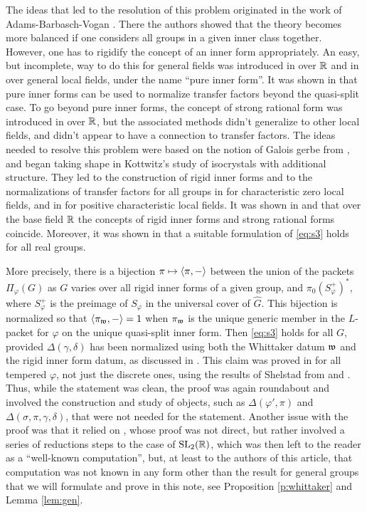 \documentclass{article}
\theoremstyle{definition}
\numberwithin{equation}{section}
\renewcommand{\-}{\hyp{}}
\begin{document}
The ideas that led to the resolution of this problem originated in the work of Adams-Barbasch-Vogan \cite{ABV92}. There the authors showed that the theory becomes more balanced if one considers all groups in a given inner class together. However, one has to rigidify the concept of an inner form appropriately. An easy, but incomplete, way to do this for general fields was introduced in \cite{ABV92} over $\mathbb{R}$ and in \cite{Vog93} over general local fields, under the name ``pure inner form''. It was shown in \cite[\S2.2]{KalECI} that pure inner forms can be used to normalize transfer factors beyond the quasi-split case. To go beyond pure inner forms, the concept of strong rational form was introduced in \cite{ABV92} over $\mathbb{R}$, but the associated methods didn't generalize to other local fields, and didn't appear to have a connection to transfer factors. The ideas needed to resolve this problem were based on the notion of Galois gerbe from \cite{LR87}, and began taking shape in Kottwitz's study \cite{Kot97} of isocrystals with additional structure. They led to the construction of rigid inner forms and to the normalizations of transfer factors for all groups in \cite{KalRI} for characteristic zero local fields, and in \cite{Dillery20} for positive characteristic local fields. It was shown in \cite[\S5.2]{KalRI} and that over the base field $\mathbb{R}$ the concepts of rigid inner forms and strong rational forms coincide. Moreover, it was shown in \cite[\S5.6]{KalRI} that a suitable formulation of \eqref{eq:s3} holds for all real groups. 

More precisely, there is a bijection $\pi \mapsto \langle\pi,-\rangle$ between the union of the packets $\Pi_\varphi(G)$ as $G$ varies over all rigid inner forms of a given group, and $\pi_0(S_\varphi^+)^*$, where $S_\varphi^+$ is the preimage of $S_\varphi$ in the universal cover of $\hat G$. This bijection is normalized so that $\langle\pi_{\mathfrak{w}},-\rangle=1$ when $\pi_{\mathfrak{w}}$ is the unique generic member in the $L$\-packet for $\varphi$ on the unique quasi-split inner form. Then \eqref{eq:s3} holds for all $G$, provided $\Delta(\gamma,\delta)$ has been normalized using both the Whittaker datum $\mathfrak{w}$ and the rigid inner form datum, as discussed in \cite[\S5.3]{KalRI}. This claim was proved in \cite[\S5.6]{KalRI} for all tempered $\varphi$, not just the discrete ones, using the results of Shelstad from \cite{SheTE2} and \cite{SheTE3}. Thus, while the statement was clean, the proof was again roundabout and involved the construction and study of objects, such as $\Delta(\varphi',\pi)$ and $\Delta(\sigma,\pi,\gamma,\delta)$, that were not needed for the statement. Another issue with the proof was that it relied on \cite[Theorem 11.5]{SheTE3}, whose proof was not direct, but rather involved a series of reductions steps to the case of $\textrm{SL}_2(\mathbb{R})$, which was then left to the reader as a ``well-known computation'', but, at least to the authors of this article, that computation was not known in any form other than the result for general groups that we will formulate and prove in this note, see Proposition \ref{p:whittaker} and Lemma \ref{lem:gen}.
\end{document}
